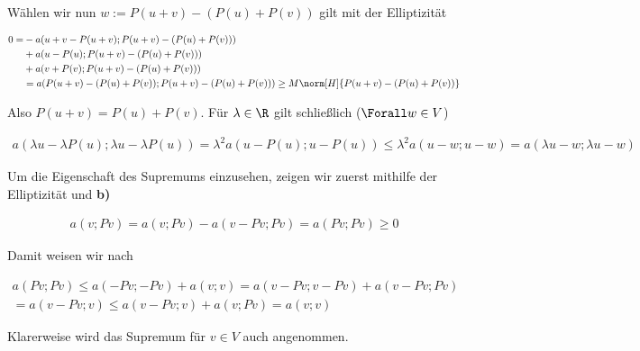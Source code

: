 \begin{solution}
\begin{enumerate}[label = \textbf{\alph*)}]
  Wählen wir nun $w := P(u + v) - (P(u) + P(v))$ gilt mit der Elliptizität

  \begin{align*}
    0
    =
    &- a(u + v - P(u + v);P(u + v) - (P(u) + P(v))) \\
    &+ a(u - P(u);P(u + v) - (P(u) + P(v))) \\
    &+ a(v + P(v);P(u + v) - (P(u) + P(v))) \\
    &=
    a(P(u + v) - (P(u) + P(v));P(u + v) - (P(u) + P(v)))
    \geq
    M \norm[H]{P(u + v) - (P(u) + P(v))}
  \end{align*}

  Also $P(u + v) = P(u) + P(v)$. Für $\lambda \in \R$ gilt schließlich ($\Forall w \in V$)

  \begin{align*}
    a(\lambda u - \lambda P(u);\lambda u - \lambda P(u))
    =
    \lambda^2 a(u - P(u);u - P(u))
    \leq
    \lambda^2 a(u - w; u - w)
    =
    a(\lambda u - w; \lambda u - w)
  \end{align*}

  Um die Eigenschaft des Supremums einzusehen, zeigen wir zuerst mithilfe der Elliptizität und \textbf{b)}

  \begin{align*}
    a(v; Pv)
    =
    a(v; Pv) - a(v-Pv; Pv)
    =
    a(Pv; Pv)
    \geq
    0
  \end{align*}

  Damit weisen wir nach

  \begin{multline*}
    a(Pv; Pv)
    \leq
    a(-Pv; -Pv) + a(v; v)
    =
    a(v-Pv; v-Pv) + a(v-Pv; Pv) \\
    =
    a(v-Pv; v)
    \leq
    a(v-Pv; v) + a(v; Pv)
    =
    a(v; v)
  \end{multline*}

  Klarerweise wird das Supremum für $v \in V$ auch angenommen.
\end{enumerate}

\end{solution}

